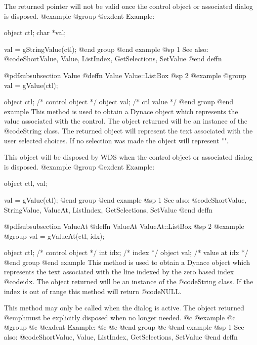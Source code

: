 The returned pointer will not be valid once the control object or
associated dialog is disposed.
@example
@group
@exdent Example:

object  ctl;
char    *val;

val = gStringValue(ctl);
@end group
@end example
@sp 1
See also:  @code{ShortValue, Value, ListIndex, GetSelections, SetValue}
@end deffn










@pdfsubsubsection {Value}
@deffn {Value} Value::ListBox
@sp 2
@example
@group
val = gValue(ctl);

object  ctl;   /*  control object  */
object  val;   /*  ctl value       */
@end group
@end example
This method is used to obtain a Dynace object which represents the value
associated with the control.  The object returned will be an instance of
the @code{String} class.  The returned object will represent the text
associated with the user selected choices.  If no selection was made
the object will represent "".

This object will be disposed by WDS when the control object or
associated dialog is disposed.
@example
@group
@exdent Example:

object  ctl, val;

val = gValue(ctl);
@end group
@end example
@sp 1
See also:  @code{ShortValue, StringValue, ValueAt, ListIndex, GetSelections, SetValue}
@end deffn









@pdfsubsubsection {ValueAt}
@deffn {ValueAt} ValueAt::ListBox
@sp 2
@example
@group
val = gValueAt(ctl, idx);

object  ctl;   /*  control object  */
int     idx;   /*  index           */
object  val;   /*  value at idx    */
@end group
@end example
This method is used to obtain a Dynace object which represents the text
associated with the line indexed by the zero based index @code{idx}.
The object returned will be an instance of the @code{String} class.  If
the index is out of range this method will return @code{NULL}.

This method may only be called when the dialog is active.  The object
returned @emph{must} be explicitly disposed when no longer needed.
@c @example
@c @group
@c @exdent Example:
@c 
@c @end group
@c @end example
@sp 1
See also:  @code{ShortValue, Value, ListIndex, GetSelections, SetValue}
@end deffn








